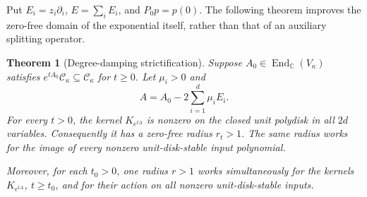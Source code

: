 \documentclass[reqno]{amsart}
\newtheorem{theorem}{Theorem}[section]
\theoremstyle{definition}
\theoremstyle{remark}
\newcommand{\C}{\mathbb C}
\begin{document}
Put \(E_i=z_i\partial_i\), \(E=\sum_iE_i\), and \(P_0p=p(0)\).
The following theorem improves the zero-free domain of the exponential
itself, rather than that of an auxiliary splitting operator.

\begin{theorem}[Degree-damping strictification]\label{spec:strict}
Suppose \(A_0\in\operatorname{End}_{\C}(V_\kappa)\) satisfies
\(e^{tA_0}\mathcal C_\kappa\subseteq\mathcal C_\kappa\) for
\(t\ge0\).  Let \(\mu_i>0\) and
\[
 A=A_0-2\sum_{i=1}^d\mu_i E_i.
\]
For every \(t>0\), the kernel \(K_{e^{tA}}\) is nonzero on the
closed unit polydisk in all \(2d\) variables.  Consequently it has a
zero-free radius \(r_t>1\).  The same radius works for the image of
every nonzero unit-disk-stable input polynomial.

Moreover, for each \(t_0>0\), one radius \(r>1\) works simultaneously
for the kernels \(K_{e^{tA}}\), \(t\ge t_0\), and for their action
on all nonzero unit-disk-stable inputs.
\end{theorem}
\end{document}
